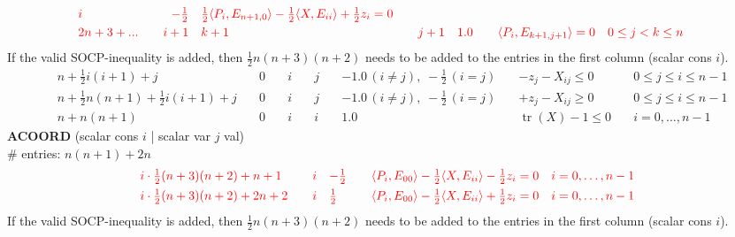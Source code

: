 \documentclass[11pt,a4paper]{article}
\DeclareMathOperator{\tr}{tr}
\theoremstyle{definition}
\begin{document}
{\[\begin{aligned}
    & {\color{red}i} \quad & {\color{red}-\tfrac{1}{2}} \quad & {\color{red}
      \tfrac{1}{2}\langle P_i, E_{n+1,0} \rangle - \tfrac{1}{2} \langle
      X,E_{ii}\rangle + \tfrac{1}{2}z_i = 0} \quad & \\
    &{\color{red}2n+3+...} \quad &{\color{red}i+1} \quad & {\color{red}k+1} \quad
    & {\color{red}j+1} \quad & {\color{red}1.0} \quad & {\color{red}
     \langle P_i, E_{k+1,j+1} \rangle = 0} \quad & {\color{red} 0 \leq j < k \leq n}
  \end{aligned}
\]
\noindent
{\color{red} If the valid SOCP-inequality is added, then $\tfrac{1}{2}n(n+3)(n+2)$ needs
to be added to the entries in the first column (scalar cons $i$).}
\[
  \begin{aligned}
    &n+\tfrac{1}{2}i(i+1)+j \quad & 0 \quad & i \quad & j \quad & -1.0\,
    (i\neq j),\; -\tfrac{1}{2}\, (i=j) \quad & -z_j - X_{ij} \leq 0 \quad &
    0 \leq j \leq i \leq n-1 \\
    &n+\tfrac{1}{2}n(n+1)+\tfrac{1}{2}i(i+1)+j \quad & 0 \quad & i \quad &
    j \quad & -1.0\, (i\neq j),\; -\tfrac{1}{2}\, (i=j) \quad & +z_j -
    X_{ij} \geq 0 \quad & 0 \leq j \leq i \leq n-1 \\
    &n+n(n+1)\quad & 0 \quad & i \quad & i \quad & 1.0 \quad & \tr(X) - 1
    \leq 0 \quad & i = 0,\dots,n-1
  \end{aligned}
\]
\textbf{ACOORD} (scalar cons $i$ | scalar var $j$ val) \\
\# entries: $n(n+1)+2n$   \\
\[
  \begin{aligned}
    &{\color{red}i\cdot\tfrac{1}{2}(n+3)(n+2) + n+1} \quad & {\color{red}i} \quad &
    {\color{red}-\tfrac{1}{2}} \quad & {\color{red} \langle P_i, E_{00}
      \rangle - \tfrac{1}{2}\langle X,E_{ii}\rangle - \tfrac{1}{2}z_i = 0}
    \quad &{\color{red} i = 0,\dots,n-1} \\
    &{\color{red}i\cdot\tfrac{1}{2}(n+3)(n+2) + 2n+2} \quad & {\color{red}i} \quad &
    {\color{red}\tfrac{1}{2}} \quad & {\color{red} \langle P_i, E_{00}
      \rangle - \tfrac{1}{2}\langle X,E_{ii}\rangle + \tfrac{1}{2}z_i = 0}
    \quad &{\color{red} i = 0,\dots,n-1} \\
  \end{aligned}
\]
{\color{red} If the valid SOCP-inequality is added, then $\tfrac{1}{2}n(n+3)(n+2)$ needs
  to be added to the entries in the first column (scalar cons $i$).}
\[
  \begin{aligned}

\end{aligned}\]}
\end{document}
